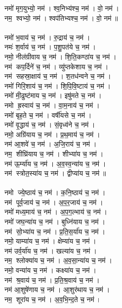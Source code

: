 नमो॑ मृग॒युभ्यो॒ नम॑। श्व॒निभ्य॑श्च॒ नम॑। वो॒ नम॑। \\
नम॒ श्वभ्यो॒ नम॑। श्वप॑तिभ्यश्च॒ नम॑। वो॒ नम॑॥ \\
\\
नमो॑ भ॒वाय॑ च॒ नम॑। रु॒द्राय॑ च॒ नम॑। \\
नमः॑ श॒र्वाय॑ च॒ नम॑। प॒शु॒पत॑ये च॒ नम॑।\\
नमो॒ नील॑ग्रीवाय च॒ नम॑। शि॒ति॒कण्ठा॑य च॒ नम॑। \\
नम॑ कप॒र्दिने॑ च॒ नम॑। व्यु॑प्तकेशाय च॒ नम॑।\\
नम॑ सहस्रा॒क्षाय॑ च॒ नम॑। श॒तध॑न्वने च॒ नम॑। \\
नमो॑ गिरि॒शाय॑ च॒ नम॑। शि॒पि॒वि॒ष्टाय॑ च॒ नम॑।\\
नमो॑ मी॒ढुष्ट॑माय च॒ नम॑। इषु॑मते च॒ नम॑। \\
नमो ह्र॒स्वाय॑ च॒ नम॑। वा॒म॒नाय॑ च॒ नम॑।\\
नमो॑ बृह॒ते च॒ नम॑। वर्षी॑यसे च॒ नम॑। \\
नमो॑ वृ॒द्धाय॑ च॒ नम॑। सं॒वृध्व॑ने च॒ नम॑। \\
नमो॒ अग्रि॑याय च॒ नम॑। प्र॒थ॒माय॑ च॒ नम॑। \\
नम॑ आ॒शवे॑ च॒ नम॑। अ॒जि॒राय॑ च॒ नम॑।\\
नम॒ शीघ्रि॑याय च॒ नम॑। शीभ्या॑य च॒ नम॑। \\
नम॑ ऊ॒र्म्या॑य च॒ नम॑। अ॒व॒स्व॒न्या॑य च॒ नम॑। \\
नम॑ स्त्रोत॒स्या॑य च॒ नम॑। द्वीप्या॑य च॒ नम॑॥\\
\\
नमो ज्ये॒ष्ठाय॑ च॒ नम॑। क॒नि॒ष्ठाय॑ च॒ नम॑। \\
नम॑ पूर्व॒जाय॑ च॒ नम॑। अ॒प॒र॒जाय॑ च॒ नम॑। \\
नमो॑ मध्य॒माय॑ च॒ नम॑। अ॒प॒ग॒ल्भाय॑ च॒ नम॑। \\
नमो॑ जघ॒न्या॑य च॒ नम॑। बुध्नि॑याय च॒ नम॑।\\
नम॑ सो॒भ्या॑य च॒ नम॑। प्र॒ति॒स॒र्या॑य च॒ नम॑। \\
नमो॒ याम्या॑य च॒ नम॑। क्षेम्या॑य च॒ नम॑। \\
नम॑ उर्व॒र्या॑य च॒ नम॑। खल्या॑य च॒ नम॑। \\
नम॒ श्लोक्या॑य च॒ नम॑। अ॒व॒सा॒न्या॑य च॒ नम॑। \\
नमो॒ वन्या॑य च॒ नम॑। कक्ष्या॑य च॒ नम॑। \\
नम॑ श्र॒वाय॑ च॒ नम॑। प्र॒ति॒श्र॒वाय॑ च॒ नम॑। \\
नम॑ आ॒शुषे॑णाय च॒ नम॑। आ॒शुर॑थाय च॒ नम॑। \\
नम॒ शूरा॑य च॒ नम॑। अ॒व॒भि॒न्द॒ते च॒ नम॑। \\
